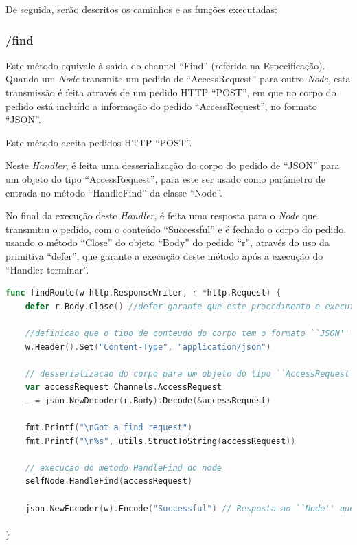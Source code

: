 De seguida, serão descritos os caminhos e as funções executadas:

\subsubsection*{/find}
Este método equivale à saída do channel ``Find'' (referido na Especificação).
Quando um \emph{Node} transmite um pedido de ``AccessRequest'' para outro \emph{Node},
esta transmissão é feita através de um pedido \acs{HTTP} ``POST'', em que no corpo 
do pedido está incluído a informação do pedido ``AccessRequest'', no formato ``JSON''.

Este método aceita pedidos \acs{HTTP} ``POST''.

Neste \emph{Handler}, é feita uma desserialização do corpo do pedido de ``JSON'' para um objeto
do tipo ``AccessRequest'', para este ser usado como parâmetro de entrada no método ``HandleFind''
da classe ``Node''.

No final da execução deste \emph{Handler}, é feita uma resposta para o \emph{Node} que transmitiu o pedido, com o conteúdo ``Successful''
e é fechado o corpo do pedido, usando o método ``Close'' do objeto ``Body'' do pedido ``r'',
através do uso da primitiva ``defer'', que garante a execução deste método após a execução do ``Handler terminar''.

\begin{lstlisting}[caption={\emph{Handler} ``findRoute'' do método ``/find''},language=Go]
func findRoute(w http.ResponseWriter, r *http.Request) {
	defer r.Body.Close() //defer garante que este procedimento e executado quando a execucao deste ``Handler'' termina

	//definicao que o tipo de conteudo do corpo tem o formato ``JSON''
	w.Header().Set("Content-Type", "application/json")

	// desserializacao do corpo para um objeto do tipo ``AccessRequest''
	var accessRequest Channels.AccessRequest
	_ = json.NewDecoder(r.Body).Decode(&accessRequest)

	fmt.Printf("\nGot a find request")
	fmt.Printf("\n%s", utils.StructToString(accessRequest))

	// execucao do metodo HandleFind do node
	selfNode.HandleFind(accessRequest)

	json.NewEncoder(w).Encode("Successful") // Resposta ao ``Node'' que realizou o pedido \acs{HTTP}

}

\end{lstlisting}


